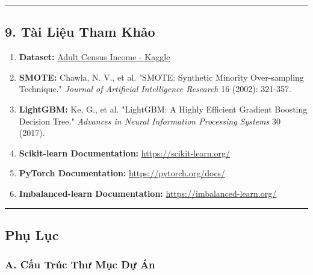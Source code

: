 \documentclass[
]{article}
\providecommand{\tightlist}{%
  \setlength{\itemsep}{0pt}\setlength{\parskip}{0pt}}
\begin{document}
\begin{center}\rule{0.5\linewidth}{0.5pt}\end{center}

\subsection{9. Tài Liệu Tham
Khảo}\label{9-tuxe0i-liux1ec7u-tham-khux1ea3o}

\begin{enumerate}
\def\labelenumi{\arabic{enumi}.}
\tightlist
\item
  \textbf{Dataset:}
  \href{https://www.kaggle.com/datasets/uciml/adult-census-income}{Adult
  Census Income - Kaggle}
\item
  \textbf{SMOTE:} Chawla, N. V., et al. "SMOTE: Synthetic Minority
  Over-sampling Technique." \emph{Journal of Artificial Intelligence
  Research} 16 (2002): 321-357.
\item
  \textbf{LightGBM:} Ke, G., et al. "LightGBM: A Highly Efficient
  Gradient Boosting Decision Tree." \emph{Advances in Neural Information
  Processing Systems} 30 (2017).
\item
  \textbf{Scikit-learn Documentation:}
  \href{https://scikit-learn.org/}{\url{https://scikit-learn.org/}}
\item
  \textbf{PyTorch Documentation:}
  \href{https://pytorch.org/docs/}{\url{https://pytorch.org/docs/}}
\item
  \textbf{Imbalanced-learn Documentation:}
  \href{https://imbalanced-learn.org/}{\url{https://imbalanced-learn.org/}}
\end{enumerate}

\begin{center}\rule{0.5\linewidth}{0.5pt}\end{center}

\subsection{Phụ Lục}\label{phux1ee5-lux1ee5c}

\subsubsection{A. Cấu Trúc Thư Mục Dự
Án}\label{a-cux1ea5u-truxfac-thux1b0-mux1ee5c-dux1ef1-uxe1n}
\end{document}
